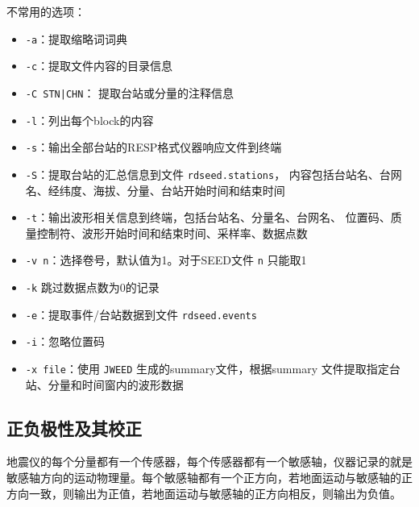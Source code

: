 不常用的选项：
\begin{itemize}
\item \texttt{-a}：提取缩略词词典
\item \texttt{-c}：提取文件内容的目录信息
\item \texttt{-C STN|CHN}： 提取台站或分量的注释信息
\item \texttt{-l}：列出每个block的内容
\item \texttt{-s}：输出全部台站的RESP格式仪器响应文件到终端
\item \texttt{-S}：提取台站的汇总信息到文件 \texttt{rdseed.stations}，
    内容包括台站名、台网名、经纬度、海拔、分量、台站开始时间和结束时间
\item \texttt{-t}：输出波形相关信息到终端，包括台站名、分量名、台网名、
    位置码、质量控制符、波形开始时间和结束时间、采样率、数据点数
\item \texttt{-v n}：选择卷号，默认值为1。对于SEED文件 \texttt{n} 只能取1
\item \texttt{-k} 跳过数据点数为0的记录
\item \texttt{-e}：提取事件/台站数据到文件 \texttt{rdseed.events}
\item \texttt{-i}：忽略位置码
\item \texttt{-x file}：使用 \texttt{JWEED} 生成的summary文件，根据summary
    文件提取指定台站、分量和时间窗内的波形数据
\end{itemize}

\subsection{正负极性及其校正}
\label{subsec:polarity-correction}

地震仪的每个分量都有一个传感器，每个传感器都有一个敏感轴，仪器记录的就是
敏感轴方向的运动物理量。每个敏感轴都有一个正方向，若地面运动与敏感轴的正
方向一致，则输出为正值，若地面运动与敏感轴的正方向相反，则输出为负值。

